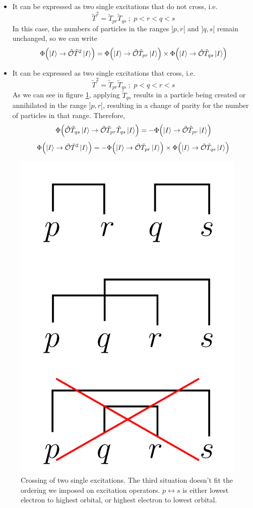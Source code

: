 \documentclass[./thesis.tex]{subfiles}
\begin{document}
\begin{itemize}
\item
It can be expressed as two single excitations that do not cross, i.e.
\begin{equation}
\tilde T^2=\tilde T_{pr} \tilde T_{qs} \; ; \; p<r<q<s
\end{equation}
In this case, the numbers of particles in the ranges $]p, r[$ and $]q, s[$ remain unchanged, so we can write
\begin{equation}
{\Phi \qty(\ket{I} \rightarrow {\hat{\mathcal{O}}}\tilde T^2 \ket{I})} =
{\Phi \qty(\ket{I} \rightarrow {\hat{\mathcal{O}}} \tilde T_{pr} \ket I)} \times
{\Phi \qty(\ket{I} \rightarrow {\hat{\mathcal{O}}}\tilde T_{qs} \ket I)}
\end{equation}

\item
It can be expressed as two single excitations that cross, i.e.
\begin{equation}
\tilde T^2=\tilde T_{pr} \tilde T_{qs} \; ; \; p<q<r<s
\end{equation}
As we can see in figure \ref{fig:biphasefactor}, applying  $\tilde T_{qs}$ results in a particle being created or annihilated in the range $]p,r[$, resulting in a change of parity for the number of particles in that range. Therefore,
\begin{equation}
{\Phi \qty({\hat{\mathcal{O}}}\tilde T_{qs} \ket{I} \rightarrow {\hat{\mathcal{O}}}\tilde T_{pr} \tilde T_{qs} \ket{I})} = -{\Phi \qty(\ket{I} \rightarrow {\hat{\mathcal{O}}} \tilde T_{pr} \ket{I})}
\end{equation}
\begin{equation}
{\Phi \qty(\ket{I} \rightarrow {\hat{\mathcal{O}}}\tilde T^2 \ket{I})} = -{\Phi \qty(\ket{I} \rightarrow {\hat{\mathcal{O}}} \tilde T_{pr} \ket{I})} \times {\Phi \qty(\ket{I} \rightarrow {\hat{\mathcal{O}}}\tilde T_{ qs} \ket{I})} 
\end{equation}

\end{itemize}



\begin{figure}[h!]
	\begin{center}
		\includegraphics[width=0.2\columnwidth]{figures/determinant_driven/biphasefactor}
		\caption{
		\label{fig:biphasefactor}%
		Crossing of two single excitations.
		The third situation doesn't fit the ordering we imposed on excitation operators. $p \leftrightarrow s$ is either lowest electron to highest orbital, or highest electron to lowest orbital.
		}
	\end{center}
\end{figure}
\end{document}
